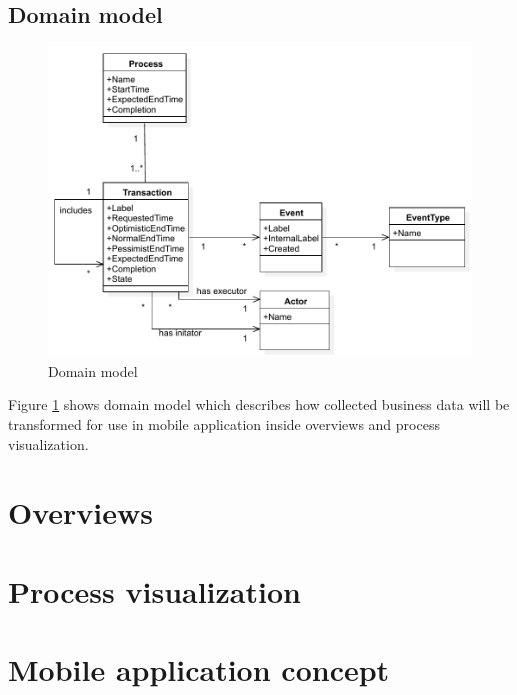     \subsection{Domain model}    
      \begin{figure}[ht!]
        \centering
        \includegraphics[width=12cm,keepaspectratio]{img/domain-core-model}
        \caption{Domain model }
        \label{fig:domain-core-model}
      \end{figure}    
      
      Figure \ref{fig:domain-core-model} shows domain model which describes how collected business data will be transformed for use in mobile application inside overviews and process visualization. 
    
    \section{Overviews}
    
    \section{Process visualization}
    
    \section{Mobile application concept}
	
    
